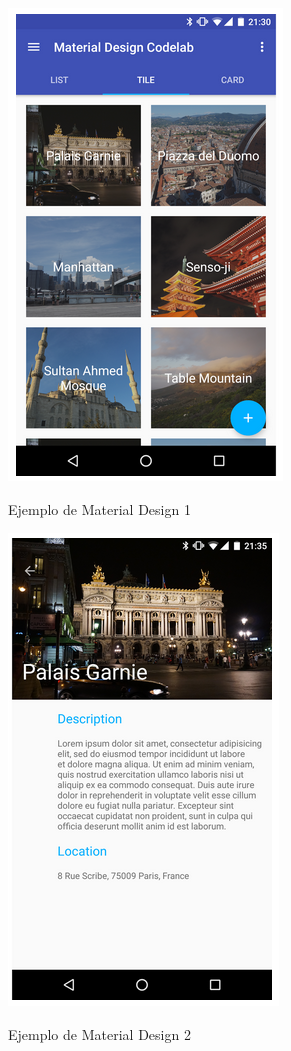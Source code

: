 \begin{figure}[H] %
\centering
\includegraphics[scale=0.5]{imagenes/desing1.png}  %
\label{design1}
\caption{Ejemplo de Material Design 1}
\end{figure}

\begin{figure}[H] %
\centering
\includegraphics[scale=0.5]{imagenes/desing2.png}  %
\label{design1}
\caption{Ejemplo de Material Design 2}
\end{figure}

